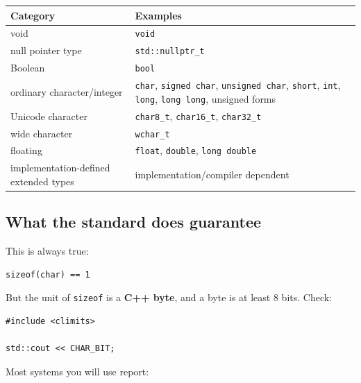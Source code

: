 {\def\LTcaptype{none} %
\begin{longtable}[]{@{}
  >{\raggedright\arraybackslash}p{}
  >{\raggedright\arraybackslash}p{}@{}}
\toprule\noalign{}
\begin{minipage}[b]{\linewidth}\raggedright
Category
\end{minipage} & \begin{minipage}[b]{\linewidth}\raggedright
Examples
\end{minipage} \\
\midrule\noalign{}
\endhead
\bottomrule\noalign{}
\endlastfoot
void & \texttt{void} \\
null pointer type & \texttt{std::nullptr\_t} \\
Boolean & \texttt{bool} \\
ordinary character/integer & \texttt{char}, \texttt{signed\ char}, \texttt{unsigned\ char}, \texttt{short}, \texttt{int}, \texttt{long}, \texttt{long\ long}, unsigned forms \\
Unicode character & \texttt{char8\_t}, \texttt{char16\_t}, \texttt{char32\_t} \\
wide character & \texttt{wchar\_t} \\
floating & \texttt{float}, \texttt{double}, \texttt{long\ double} \\
implementation-defined extended types & implementation/compiler dependent \\
\end{longtable}
}

\subsection{What the standard does guarantee}\label{05-engine-i-ch002-what-the-standard-does-guarantee}

This is always true:

\begin{verbatim}
sizeof(char) == 1
\end{verbatim}

But the unit of \texttt{sizeof} is a \textbf{C++ byte}, and a byte is at least 8 bits. Check:

\begin{verbatim}
#include <climits>

std::cout << CHAR_BIT;
\end{verbatim}

Most systems you will use report:

